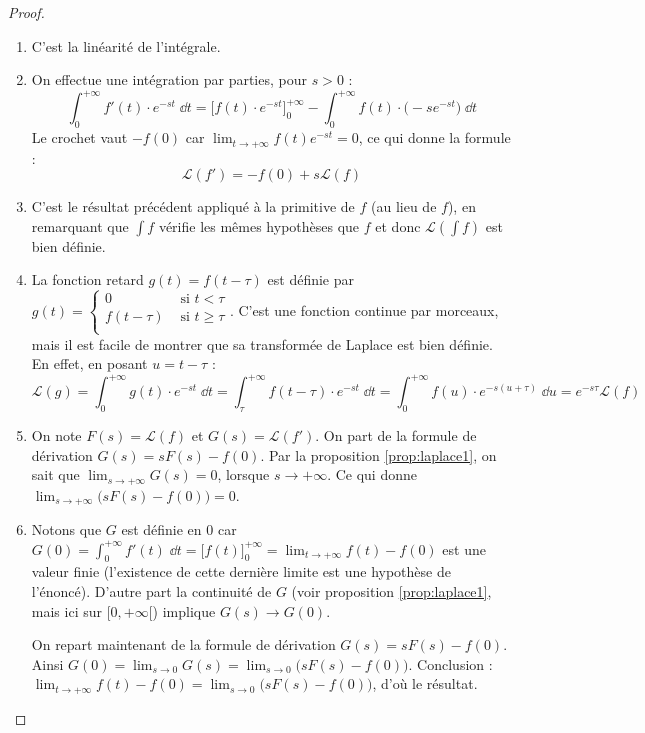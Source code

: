 \documentclass[class=report,crop=false]{standalone}
\begin{document}
\begin{proof}
\begin{enumerate}
  \item C'est la linéarité de l'intégrale.
  
  \item On effectue une intégration par parties, pour $s>0$ :
  $$\int_0^{+\infty} f'(t) \cdot e^{-st}\;\dd t
  = \Big[ f(t) \cdot e^{-st} \Big]_0^{+\infty} 
  - \int_0^{+\infty} f(t) \cdot \big( -se^{-st} \big) \;\dd t$$
  Le crochet vaut $-f(0)$ car $\lim_{t\to +\infty} f(t)e^{-st} = 0$, 
  ce qui donne la formule :
  $$\mathcal{L}(f') = -f(0) + s \mathcal{L}(f)$$
  
  \item C'est le résultat précédent appliqué à la primitive de $f$ (au lieu de $f$),
  en remarquant que $\int f$ vérifie les mêmes hypothèses que $f$ et donc 
  $\mathcal{L}(\int f)$ est bien définie.
  
  \item La fonction retard $g(t)=f(t-\tau)$ est définie par 
  $g(t) = 
  \begin{cases} 
    0         & \text{ si } t < \tau \\
    f(t-\tau) & \text{ si } t \ge \tau \\ 
  \end{cases}
  $. C'est une fonction continue par morceaux, mais il est facile de montrer que sa
  transformée de Laplace est bien définie.
  En effet, en posant $u=t-\tau$ :
  $$\mathcal{L}(g)
  = \int_0^{+\infty} g(t) \cdot e^{-st}\;\dd t
  = \int_\tau^{+\infty} f(t-\tau) \cdot e^{-st}\;\dd t
  = \int_0^{+\infty} f(u) \cdot e^{-s(u+\tau)}\;\dd u
  = e^{-s\tau}\mathcal{L}(f)$$
  
  
  \item On note $F(s) = \mathcal{L}(f)$ et $G(s) = \mathcal{L}(f')$.
  On part de la formule de dérivation 
  $G(s) = s F(s)-f(0)$.
  Par la proposition \ref{prop:laplace1}, on sait que 
  $\lim_{s\to+\infty} G(s) = 0$, lorsque $s\to+\infty$.
  Ce qui donne $\lim_{s\to+\infty} \big(s F(s)-f(0)\big) = 0$.
  
  \item Notons que $G$ est définie en $0$ car 
  $G(0) = \int_0^{+\infty} f'(t) \;\dd t = \Big[ f(t) \Big]_0^{+\infty}
  = \lim_{t\to+\infty} f(t) - f(0)$ est une valeur finie
  (l'existence de cette dernière limite est une hypothèse de l'énoncé).
  D'autre part la continuité de $G$ 
  (voir proposition \ref{prop:laplace1}, mais ici sur $[0,+\infty[$)
  implique $G(s) \to G(0)$. 
  
  
  On repart maintenant de la formule de dérivation $G(s) = s F(s)-f(0)$. 
  Ainsi $G(0) = \lim_{s\to0} G(s) = \lim_{s\to0} \big(s F(s)-f(0)\big)$.
  Conclusion : $ \lim_{t\to+\infty} f(t) - f(0) = \lim_{s\to0} \big(s F(s)-f(0)\big)$, 
  d'où le résultat.
\end{enumerate}
 
\end{proof}
\end{document}
